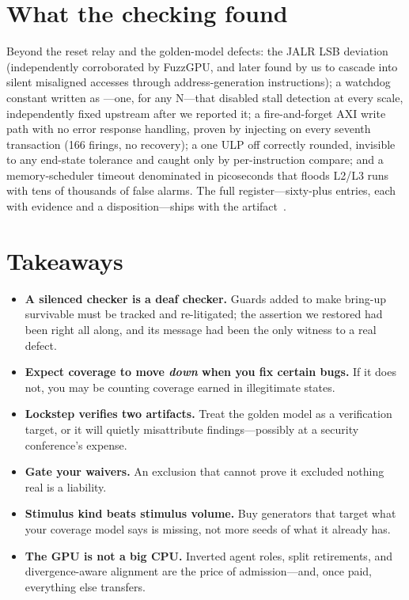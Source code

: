 \documentclass[conference]{IEEEtran}
\newcommand{\code}[1]{\texttt{\detokenize{#1}}}
\begin{document}
\section{What the checking found}
Beyond the reset relay and the golden-model defects: the JALR LSB
deviation (independently corroborated by FuzzGPU, and later found by
us to cascade into silent misaligned accesses through
address-generation instructions); a watchdog constant written as
\code{1**N}---one, for any N---that disabled stall detection at every
scale, independently fixed upstream after we reported it; a
fire-and-forget AXI write path with no error response handling,
proven by injecting \code{SLVERR} on every seventh transaction (166
firings, no recovery); a \code{fsqrt.s} one ULP off correctly
rounded, invisible to any end-state tolerance and caught only by
per-instruction compare; and a memory-scheduler timeout denominated
in picoseconds that floods L2/L3 runs with tens of thousands of
false alarms. The full register---sixty-plus entries, each with
evidence and a disposition---ships with the artifact~\cite{preprint}.

\section{Takeaways}
\begin{itemize}
	\item \textbf{A silenced checker is a deaf checker.} Guards added to
	      make bring-up survivable must be tracked and re-litigated; the
	      assertion we restored had been right all along, and its message had
	      been the only witness to a real defect.
	\item \textbf{Expect coverage to move \emph{down} when you fix
		      certain bugs.} If it does not, you may be counting coverage earned in
	      illegitimate states.
	\item \textbf{Lockstep verifies two artifacts.} Treat the golden
	      model as a verification target, or it will quietly misattribute
	      findings---possibly at a security conference's expense.
	\item \textbf{Gate your waivers.} An exclusion that cannot prove it
	      excluded nothing real is a liability.
	\item \textbf{Stimulus kind beats stimulus volume.} Buy generators
	      that target what your coverage model says is missing, not more seeds
	      of what it already has.
	\item \textbf{The GPU is not a big CPU.} Inverted agent roles, split
	      retirements, and divergence-aware alignment are the price of
	      admission---and, once paid, everything else transfers.
\end{itemize}
\end{document}
